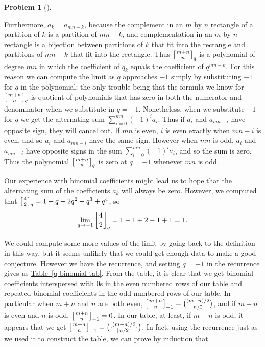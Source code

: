 \documentclass[10pt,]{book}
\theoremstyle{plain}
\theoremstyle{definition}
\newtheorem{activity}[project]{Problem}
\theoremstyle{definition}
\numberwithin{equation}{chapter}
\newcommand{\qchoose}[2]{\left[{#1\atop#2}\right]_q}
\def\neg1choose#1#2{\left[{#1\atop#2}\right]_{-1}}
\begin{document}
\begin{activity}[]
\begin{enumerate}[font=\bfseries,label=(\alph*),ref=\alph*]
Furthermore, \(a_k=a_{mn-k}\), because the complement in an \(m\) by \(n\) rectangle of a partition of \(k\) is a partition of \(mn-k\), and complementation in an \(m\) by \(n\) rectangle is a bijection between partitions of \(k\) that fit into the rectangle and partitions of \(mn-k\) that fit into the rectangle. Thus \(\qchoose{m+n}{n}\) is a polynomial of degree \(mn\) in which the coefficient of \(q_k\) equals the coefficient of \(q^{mn-k}\). For this reason we can compute the limit as \(q\) approaches \(-1\) simply by substituting \(-1\) for \(q\) in the polynomial; the only trouble being that the formula we know for \(\qchoose{m+n}{n}\) is quotient of polynomials that has zero in both the numerator and denominator when we substitute in \(q=-1\). Nonetheless, when we substitute \(-1\) for \(q\) we get the alternating sum \(\sum_{i=0}^{mn} (-1)^ia_i\).  Thus if \(a_i\) and \(a_{mn-i}\) have opposite sign, they will cancel out. If \(mn\) is even, \(i\) is even exactly when \(mn-i\) is even, and so \(a_i\) and \(a_{mn-i}\) have the same sign. However when \(mn\) is odd, \(a_i\) and \(a_{mn-i}\) have opposite signs in the sum \(\sum_{i=0}^{mn} (-1)^ia_i\), and so the sum is zero.  Thus the polynomial \(\qchoose{m+n}{n}\) is zero at \(q=-1\) whenever \(mn\) is odd.%
\par
Our experience with binomial coefficients might lead us to hope that the alternating sum of the coefficients \(a_k\) will always be zero. However, we computed that \(\qchoose{4}{2}=1+q+2q^2+q^3+q^4\), so%
\begin{equation*}
\lim_{q\rightarrow -1}\qchoose{4}{2}=1-1+2-1+1=1.
\end{equation*}
%
\par
We could compute some more values of the limit by going back to the definition in this way, but it seems unlikely that we could get enough data to make a good conjecture. However we have the recurrence, and setting \(q=-1\) in the recurrence gives us \hyperref[q-binomial-tab]{Table~\ref{q-binomial-tab}}.  From the table, it is clear that we get binomial coefficients interspersed with 0s in the even numbered rows of our table and repeated binomial coefficients in the odd numbered rows of our table. In particular when \(m+n\) and \(n\) are both even, \(\neg1choose{m+n}{n}=\binom{(m+n)/2}{n/2}\), and if \(m+n\) is even and \(n\) is odd, \(\neg1choose{m+n}{n}=0\). In our table, at least, if \(m+n\) is odd, it appears that we get \(\neg1choose{m+n}{n}=\binom{\lfloor(m+n)/2\rfloor}{\lfloor n/2\rfloor}\). In fact, using the recurrence just as we used it to construct the table, we can prove by induction that%

\end{enumerate}
\end{activity}
\end{document}
